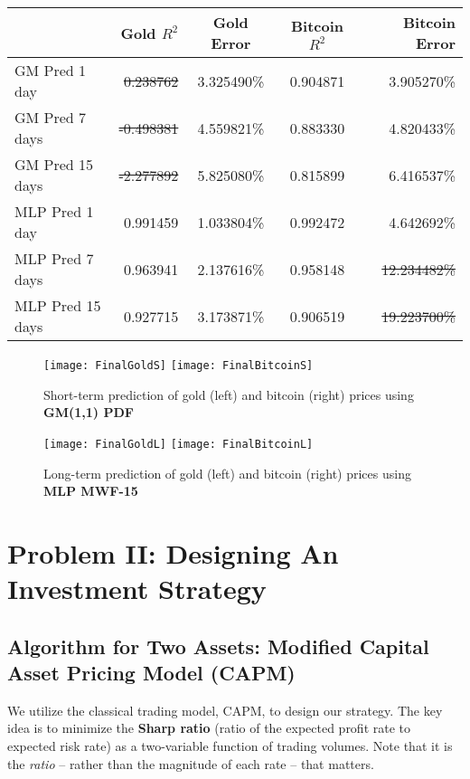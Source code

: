 \documentclass{mcmthesis}
\begin{document}
	\begin{center}
		\begin{tabular}{l|rccr}
			\toprule
			& Gold $R^2$ & Gold Error & Bitcoin $R^2$ & Bitcoin Error \\ \midrule
			GM Pred 1 day & \sout{0.238762} & 3.325490\% & 0.904871 & 3.905270\% \\
			GM Pred 7 days & \sout{-0.498381} & 4.559821\% & 0.883330 & 4.820433\% \\
			GM Pred 15 days & \sout{-2.277892} & 5.825080\% & 0.815899 & 6.416537\% \\
			MLP Pred 1 day & 0.991459 & 1.033804\% & 0.992472 & 4.642692\% \\
			MLP Pred 7 days & 0.963941 & 2.137616\% & 0.958148 & \sout{12.234482\%} \\
			MLP Pred 15 days & 0.927715 & 3.173871\% & 0.906519 & \sout{19.223700\%} \\
			\bottomrule
		\end{tabular}
	\end{center}
	
	\begin{figure}[h]
		\label {fig:11}
		\centering \texttt{[image: FinalGoldS]}
		\centering \texttt{[image: FinalBitcoinS]}
		\caption{Short-term prediction of gold (left) and bitcoin (right) prices using \textbf{GM(1,1) PDF}}
	\end{figure}
	
	\begin{figure}[h]
		\centering \texttt{[image: FinalGoldL]}
		\centering \texttt{[image: FinalBitcoinL]}
		\caption{Long-term prediction of gold (left) and bitcoin (right) prices using \textbf{MLP MWF-15}}
	\end{figure}
	
	\newpage
	\section{Problem II: Designing An Investment Strategy}
	
	\subsection{Algorithm for Two Assets: Modified Capital Asset Pricing Model (CAPM)}
	\label{sec:4.1}
	
	We utilize the classical trading model, CAPM, to design our strategy. The key idea is to minimize the \textbf{Sharp ratio} (ratio of the expected profit rate to expected risk rate) as a two-variable function of trading volumes. Note that it is the \textit{ratio} -- rather than the magnitude of each rate -- that matters. 
	
\end{document}
